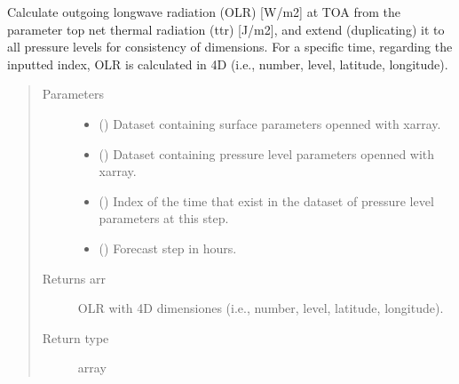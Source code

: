 \documentclass[a4paper,11pt,english]{sphinxmanual}
\begin{document}

\begin{fulllineitems}
\label{\detokenize{modules:envlib.processing_surf_vars.extend_olr_pl_5d}}
Calculate outgoing longwave radiation (OLR) {[}W/m2{]} at TOA from the parameter top net thermal radiation (ttr)
{[}J/m2{]}, and extend (duplicating) it to all pressure levels for consistency of dimensions. For a specific time, 
regarding the inputted index, OLR is calculated in 4D (i.e., number, level, latitude, longitude).
\begin{quote}\begin{description}
\item[{Parameters}] \leavevmode\begin{itemize}
\item {} 
 () \textendash{} Dataset containing surface parameters openned with xarray.

\item {} 
 () \textendash{} Dataset containing pressure level parameters openned with xarray.

\item {} 
 () \textendash{} Index of the time that exist in the dataset of pressure level parameters at this step.

\item {} 
 () \textendash{} Forecast step in hours.

\end{itemize}

\item[{Returns arr}] \leavevmode
OLR with 4D dimensiones (i.e., number, level, latitude, longitude).

\item[{Return type}] \leavevmode
array

\end{description}\end{quote}

\end{fulllineitems}
\end{document}
